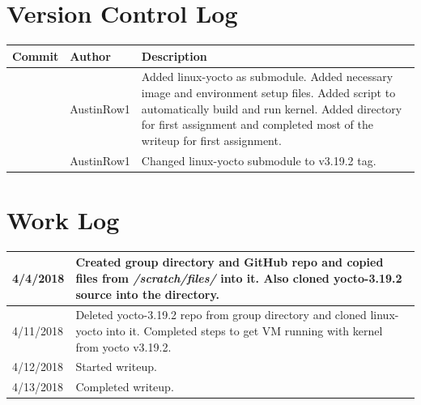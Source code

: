 \documentclass[onecolumn,draftclsnofoot, 10pt, compsoc]{IEEEtran}
\begin{document}
\section{Version Control Log}
	\begin{tabular}{|p{5cm}|p{5cm}|p{5cm}|}
		\hline
		\textbf{Commit} & \textbf{Author} & \textbf{Description}\\
		\hline
		\textcolor{blue}{\underline{\href[pdfnewwindow=true]{https://github.com/AustinRow1/OperatingSystems2/commit/a16450931755558a70be019c26f54b8a1c2c63d1}{a164509}}} & AustinRow1 & Added linux-yocto as submodule. Added necessary image and environment setup files. Added script to automatically build and run kernel. Added directory for first assignment and completed most of the writeup for first assignment.\\\hline
		\textcolor{blue}{\underline{\href[pdfnewwindow=true]{https://github.com/AustinRow1/OperatingSystems2/commit/41ff2f23ebb0a8e9ab44df4e0ff71790bc135c44}{41ff2f2}}} & AustinRow1 & Changed linux-yocto submodule to v3.19.2 tag.\\\hline
	\end{tabular}

\section{Work Log}
\begin{center}
	\begin{tabular}{ |p{2cm}|p{12cm}| }
		\hline
		4/4/2018 & Created group directory and GitHub repo and copied files from \textit{/scratch/files/} into it.
		           Also cloned yocto-3.19.2 source into the directory. \\
		\hline
		4/11/2018 & Deleted yocto-3.19.2 repo from group directory and cloned linux-yocto into it.
		            Completed steps to get VM running with kernel from yocto v3.19.2. \\
		\hline
		4/12/2018 & Started writeup. \\
		\hline
		4/13/2018 & Completed writeup. \\
		\hline
	\end{tabular}
\end{center}

\bibdata{}


\end{document}
